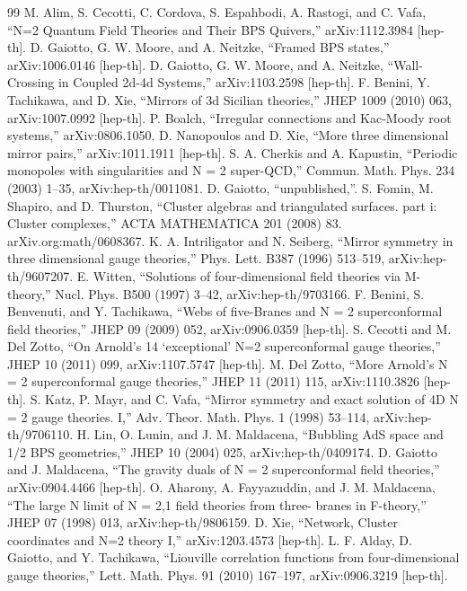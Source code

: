 \begin{thebibliography}{99}
 M. Alim, S. Cecotti, C. Cordova, S. Espahbodi, A. Rastogi, and C. Vafa, “N=2 Quantum Field Theories and Their BPS Quivers,” arXiv:1112.3984 [hep-th].
 D. Gaiotto, G. W. Moore, and A. Neitzke, “Framed BPS states,” arXiv:1006.0146 [hep-th].
 D. Gaiotto, G. W. Moore, and A. Neitzke, “Wall-Crossing in Coupled 2d-4d Systems,” arXiv:1103.2598 [hep-th].
 F. Benini, Y. Tachikawa, and D. Xie, “Mirrors of 3d Sicilian theories,” JHEP 1009 (2010) 063, arXiv:1007.0992 [hep-th].
 P. Boalch, “Irregular connections and Kac-Moody root systems,” arXiv:0806.1050.
 D. Nanopoulos and D. Xie, “More three dimensional mirror pairs,” arXiv:1011.1911 [hep-th].
 S. A. Cherkis and A. Kapustin, “Periodic monopoles with singularities and N = 2 super-QCD,” Commun. Math. Phys. 234 (2003) 1–35, arXiv:hep-th/0011081.
 D. Gaiotto, “unpublished,”.
 S. Fomin, M. Shapiro, and D. Thurston, “Cluster algebras and triangulated surfaces. part i: Cluster complexes,” ACTA MATHEMATICA 201 (2008) 83. arXiv.org:math/0608367.
 K. A. Intriligator and N. Seiberg, “Mirror symmetry in three dimensional gauge theories,” Phys. Lett. B387 (1996) 513–519, arXiv:hep-th/9607207.
 E. Witten, “Solutions of four-dimensional ﬁeld theories via M-theory,” Nucl. Phys. B500 (1997) 3–42, arXiv:hep-th/9703166.
 F. Benini, S. Benvenuti, and Y. Tachikawa, “Webs of ﬁve-Branes and N = 2 superconformal ﬁeld theories,” JHEP 09 (2009) 052, arXiv:0906.0359 [hep-th].
 S. Cecotti and M. Del Zotto, “On Arnold’s 14 ‘exceptional’ N=2 superconformal gauge theories,” JHEP 10 (2011) 099, arXiv:1107.5747 [hep-th].
 M. Del Zotto, “More Arnold’s N = 2 superconformal gauge theories,” JHEP 11 (2011) 115, arXiv:1110.3826 [hep-th].
 S. Katz, P. Mayr, and C. Vafa, “Mirror symmetry and exact solution of 4D N = 2 gauge theories. I,” Adv. Theor. Math. Phys. 1 (1998) 53–114, arXiv:hep-th/9706110.
 H. Lin, O. Lunin, and J. M. Maldacena, “Bubbling AdS space and 1/2 BPS geometries,” JHEP 10 (2004) 025, arXiv:hep-th/0409174.
 D. Gaiotto and J. Maldacena, “The gravity duals of N = 2 superconformal ﬁeld theories,” arXiv:0904.4466 [hep-th].
 O. Aharony, A. Fayyazuddin, and J. M. Maldacena, “The large N limit of N = 2,1 ﬁeld theories from three- branes in F-theory,” JHEP 07 (1998) 013, arXiv:hep-th/9806159.
 D. Xie, “Network, Cluster coordinates and N=2 theory I,” arXiv:1203.4573 [hep-th].
 L. F. Alday, D. Gaiotto, and Y. Tachikawa, “Liouville correlation functions from four-dimensional gauge theories,” Lett. Math. Phys. 91 (2010) 167–197, arXiv:0906.3219 [hep-th].

\end{thebibliography}
